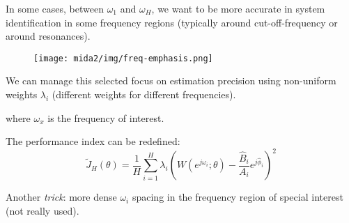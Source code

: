 \begin{remark}
    In some cases, between $\omega_1$ and $\omega_H$, we want to be more accurate in system identification in some frequency regions (typically around cut-off-frequency or around resonances).
    
    \begin{figure}[H]
        \centering
        \texttt{[image: mida2/img/freq-emphasis.png]}
    \end{figure}

    We can manage this selected focus on estimation precision using non-uniform weights $\lambda_i$ (different weights for different frequencies).

    \begin{figure}[H]
        \centering
    \end{figure}
    
    where $\omega_x$ is the frequency of interest.
    
    
    The performance index can be redefined:
    \[
        \tilde{J}_H (\theta) = \frac{1}{H} \sum_{i=1}^H \lambda_i \left(W(e^{j\omega_i};\theta) - \frac{\hat{B}_i}{A_i}e^{j\hat{\phi}_i}\right)^2
    \]

    Another \emph{trick}: more dense $\omega_i$ spacing in the frequency region of special interest (not really used).
\end{remark}

